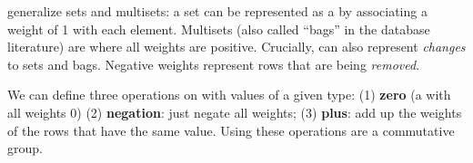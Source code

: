
\zrs generalize sets and multisets: a set can be represented as a \zr
by associating a weight of 1 with each element.  Multisets (also
called ``bags'' in the database literature) are \zrs where all weights
are positive.  Crucially, \zrs can also represent \emph{changes} to
sets and bags.  Negative weights represent rows that are being
\emph{removed}.

We can define three operations on \zrs with values of a given type:
(1) \textbf{zero} (a \zr with all weights 0) (2) \textbf{negation}:
just negate all weights; (3) \textbf{plus}: add up the weights of the
rows that have the same value.  Using these operations \zrs are a
commutative group.



%
%

